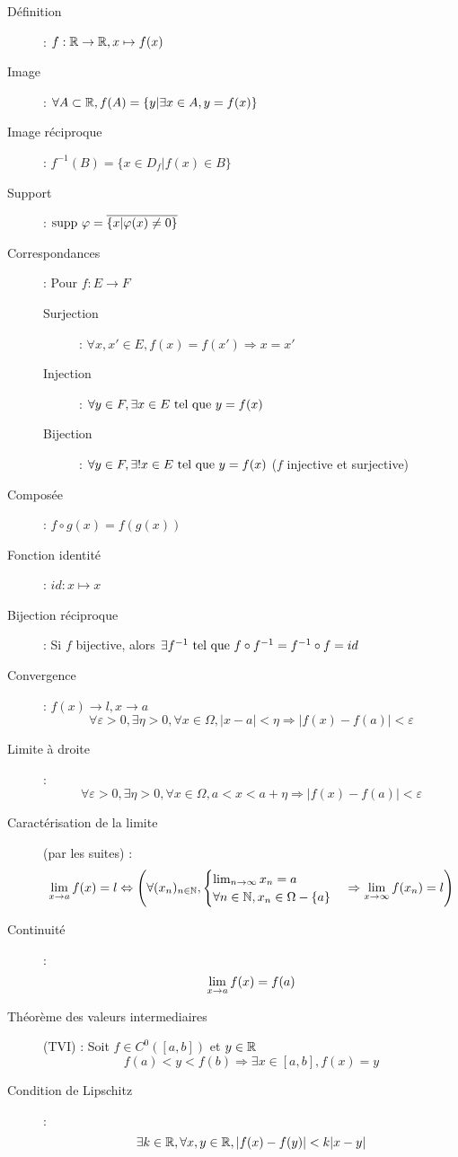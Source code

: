 \begin{description}
\item[Définition] : $f:\mathbb{R}\rightarrow\mathbb{R},x\mapsto f(x)$
\item[Image] : $\forall A\subset\mathbb{R}, f(A)=\{y|\exists x\in A, y=f(x)\}$
\item[Image réciproque] : $f^{-1}(B)=\{x\in D_f|f(x)\in B\}$
\item[Support] : $\textrm{supp }\varphi=\overline{\{x|\varphi(x)\ne 0\}}$
\item[Correspondances] : Pour $f:E\rightarrow F$
    \begin{description}
        \item[Surjection] : $\forall x,x'\in E, f(x)=f(x')\Rightarrow x=x'$
        \item[Injection] : $\forall y\in F, \exists x\in E\textrm{ tel que } y=f(x)$
        \item[Bijection] : $\forall y\in F, \exists!x\in E\textrm{ tel que } y=f(x)$
            ($f$ injective et surjective)
    \end{description}
\item[Composée] : $f\circ g(x)=f(g(x))$
\item[Fonction identité] : $id:x\mapsto x$
\item[Bijection réciproque] : Si $f$ bijective, alors $\exists f^{-1}\textrm{ tel que } f\circ f^{-1}=f^{-1}\circ f=id$
\item[Convergence] : $f(x)\longrightarrow l, x\longrightarrow a$
    \[
        \forall\varepsilon>0,
        \exists\eta>0,
        \forall x\in\Omega,
        |x-a|<\eta\Rightarrow|f(x)-f(a)|<\varepsilon
    \]
\item[Limite à droite] : 
    \[
        \forall\varepsilon>0,
        \exists\eta>0,
        \forall x\in\Omega,
        a<x<a+\eta\Rightarrow|f(x)-f(a)|<\varepsilon
    \]
\item[Caractérisation de la limite] (par les suites) : 
    \[
        \lim_{x\rightarrow a}f(x)=l\Leftrightarrow
        \left(
        \forall (x_n)_{n\in\mathbb{N}},
        \begin{cases}
            \lim_{n\rightarrow\infty}x_n=a \\
            \forall n\in\mathbb{N}, x_n\in\Omega-\{a\}
        \end{cases}
        \Rightarrow
        \lim_{x\rightarrow\infty}f(x_n)=l
        \right)
    \]
\item[Continuité] : \[ \lim_{x\rightarrow a}f(x)=f(a) \]
\item[Théorème des valeurs intermediaires] (TVI) : Soit $f\in C^0([a,b])$ et $y\in\mathbb{R}$
    \[ f(a)<y<f(b)\Rightarrow\exists x\in[a,b], f(x)=y \]
\item[Condition de Lipschitz] : 
    \[ \exists k\in\mathbb{R}, \forall x,y\in\mathbb{R},
    |f(x)-f(y)|<k|x-y| \]
\end{description}